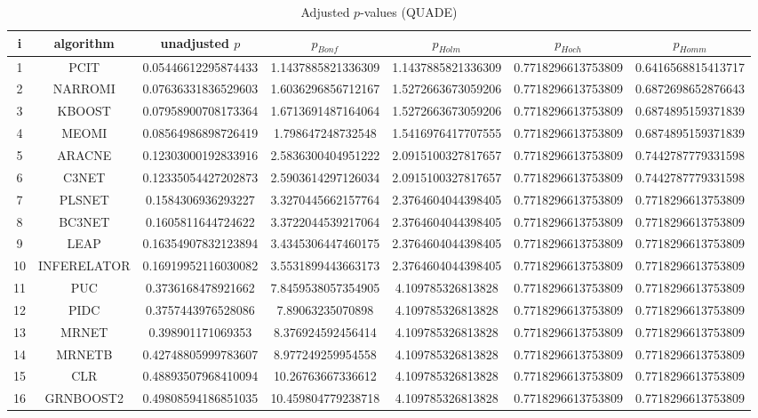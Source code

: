 \documentclass[a4paper,10pt]{article}
\begin{document}
\begin{landscape}
\begin{table}[!htp]
\centering\scriptsize
\caption{Adjusted $p$-values (QUADE)}
\begin{tabular}{ccccccc}
i&algorithm&unadjusted $p$&$p_{Bonf}$&$p_{Holm}$&$p_{Hoch}$&$p_{Homm}$\\
\hline
1&PCIT&0.05446612295874433&1.1437885821336309&1.1437885821336309&0.7718296613753809&0.6416568815413717\\
2&NARROMI&0.07636331836529603&1.6036296856712167&1.5272663673059206&0.7718296613753809&0.6872698652876643\\
3&KBOOST&0.07958900708173364&1.6713691487164064&1.5272663673059206&0.7718296613753809&0.6874895159371839\\
4&MEOMI&0.08564986898726419&1.798647248732548&1.5416976417707555&0.7718296613753809&0.6874895159371839\\
5&ARACNE&0.12303000192833916&2.5836300404951222&2.0915100327817657&0.7718296613753809&0.7442787779331598\\
6&C3NET&0.12335054427202873&2.5903614297126034&2.0915100327817657&0.7718296613753809&0.7442787779331598\\
7&PLSNET&0.1584306936293227&3.3270445662157764&2.3764604044398405&0.7718296613753809&0.7718296613753809\\
8&BC3NET&0.1605811644724622&3.3722044539217064&2.3764604044398405&0.7718296613753809&0.7718296613753809\\
9&LEAP&0.16354907832123894&3.4345306447460175&2.3764604044398405&0.7718296613753809&0.7718296613753809\\
10&INFERELATOR&0.16919952116030082&3.5531899443663173&2.3764604044398405&0.7718296613753809&0.7718296613753809\\
11&PUC&0.3736168478921662&7.8459538057354905&4.109785326813828&0.7718296613753809&0.7718296613753809\\
12&PIDC&0.3757443976528086&7.89063235070898&4.109785326813828&0.7718296613753809&0.7718296613753809\\
13&MRNET&0.398901171069353&8.376924592456414&4.109785326813828&0.7718296613753809&0.7718296613753809\\
14&MRNETB&0.42748805999783607&8.977249259954558&4.109785326813828&0.7718296613753809&0.7718296613753809\\
15&CLR&0.48893507968410094&10.26763667336612&4.109785326813828&0.7718296613753809&0.7718296613753809\\
16&GRNBOOST2&0.49808594186851035&10.459804779238718&4.109785326813828&0.7718296613753809&0.7718296613753809\\

\end{tabular}
\end{table}
\end{landscape}
\end{document}
